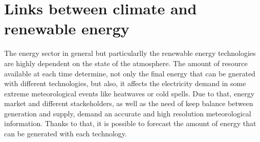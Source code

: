 






\section{Links between climate and renewable energy}


The energy sector in general but particularlly the renewable energy technologies are highly dependent on the state of the atmosphere. The amount of resource available at each time determine, not only the final energy that can be gnerated with different technologies, but also, it affects the electricity demand in some extreme meteorological events like heatwaves or cold spells. Due to that, energy market and different stackeholders, as well as the need of keep balance between generation and supply, demand an accurate and high resolution meteorological information. Thanks to that, it is possible to forecast the amount of energy that can be generated with each technology. 

